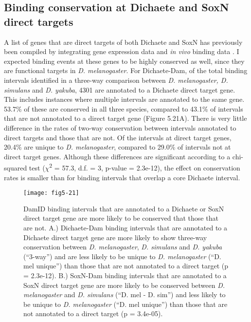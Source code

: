 \subsection{Binding conservation at Dichaete and SoxN direct targets}
A list of genes that are direct targets of both Dichaete and SoxN has previously been compiled by integrating gene expression data and \emph{in vivo} binding data \citep{aleksic_role_2013,ferrero_soxneuro_2014}. I expected binding events at these genes to be highly conserved as well, since they are functional targets in \emph{D. melanogaster}. For Dichaete-Dam, of the total binding intervals identified in a three-way comparison between \emph{D. melanogaster, D. simulans} and \emph{D. yakuba}, 4301 are annotated to a Dichaete direct target gene. This includes instances where multiple intervals are annotated to the same gene. 53.7\% of these are conserved in all three species, compared to 43.1\% of intervals that are not annotated to a direct target gene (Figure 5.21A). There is very little difference in the rates of two-way conservation between intervals annotated to direct targets and those that are not. Of the intervals at direct target genes, 20.4\% are unique to \emph{D. melanogaster}, compared to 29.0\% of intervals not at direct target genes. Although these differences are significant according to a chi-squared test (\(\chi\)\textsuperscript{2} = 57.3, d.f. = 3, p-value = 2.3e-12), the effect on conservation rates is smaller than for binding intervals that overlap a core Dichaete interval.

\begin{figure}
\centering
\texttt{[image: fig5-21]}
\caption[DamID binding intervals that are annotated to a Dichaete or SoxN direct target gene are more likely to be conserved that those that are not]{DamID binding intervals that are annotated to a Dichaete or SoxN direct target gene are more likely to be conserved that those that are not. A.) Dichaete-Dam binding intervals that are annotated to a Dichaete direct target gene are more likely to show three-way conservation between \emph{D. melanogaster}, \emph{D. simulans} and \emph{D. yakuba} (“3-way”) and are less likely to be unique to \emph{D. melanogaster} (“D. mel unique”) than those that are not annotated to a direct target (p = 2.3e-12). B.) SoxN-Dam binding intervals that are annotated to a SoxN direct target gene are more likely to be conserved between \emph{D. melanogaster} and \emph{D. simulans} (“D. mel - D. sim”) and less likely to be unique to \emph{D. melanogaster} (“D. mel unique”) than those that are not annotated to a direct target (p = 3.4e-05).}
\label{Figure 5.21}
\end{figure}

